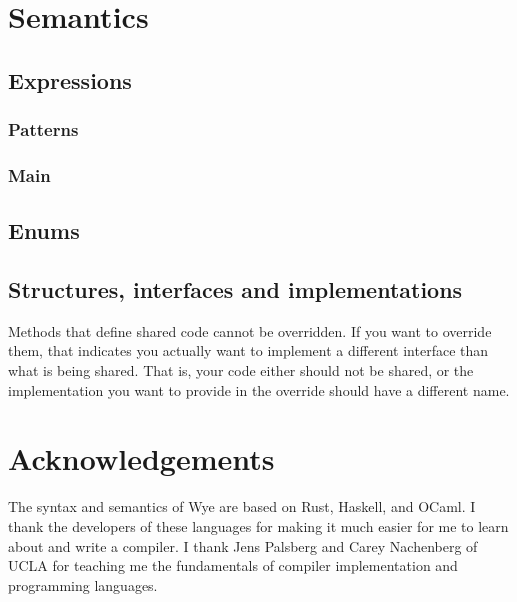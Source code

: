 \documentclass[a4paper, 12pt]{article}
\begin{document}
\section{Semantics}

\subsection{Expressions}

\subsubsection{Patterns}

\subsubsection{Main}

\subsection{Enums}

\subsection{Structures, interfaces and implementations}

Methods that define shared code cannot be overridden. If you want to override them, that indicates you
actually want to implement a different interface than what is being shared. That is, your code either
should not be shared, or the implementation you want to provide in the override should have a
different name.

\pagebreak
\section{Acknowledgements}
The syntax and semantics of Wye are based on Rust, Haskell, and OCaml. I thank
the developers of these languages for making it much easier for me to learn
about and write a compiler. I thank Jens Palsberg and Carey Nachenberg of UCLA
for teaching me the fundamentals of compiler implementation and programming
languages.

\pagebreak



\end{document}
